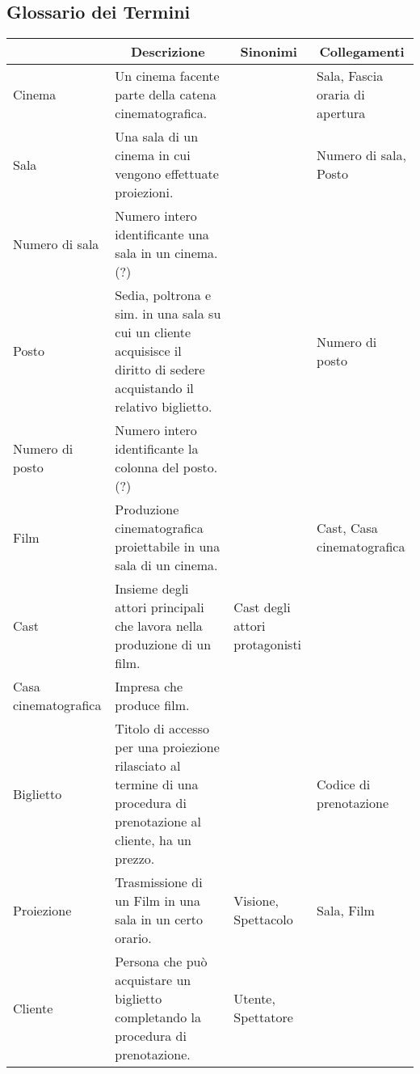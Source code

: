 \subsection*{Glossario dei Termini}
%
%
\begin{longtable}{|p{3.86cm}|p{3.86cm}|p{3.86cm}|p{3.86cm}|}
    \hline
    \rowcolor{tblhdrcolor}
    \multicolumn{1}{|c|}{\textbf{Termine}}
     & \multicolumn{1}{|c|}{\textbf{Descrizione}}
     & \multicolumn{1}{|c|}{\textbf{Sinonimi}}
     & \multicolumn{1}{|c|}{\textbf{Collegamenti}}
    \\\hline
    Cinema
     & Un cinema facente parte della catena cinematografica.
     &
     & Sala, Fascia oraria di apertura
    \\\hline
    Sala
     & Una sala di un cinema in cui vengono effettuate proiezioni.
     &
     & Numero di sala, Posto
    \\\hline
    Numero di sala
     & Numero intero identificante una sala in un cinema. (?)
     &
     &
    \\\hline
    Posto
     & Sedia, poltrona e sim. in una sala su cui un cliente acquisisce
    il diritto di sedere acquistando il relativo biglietto.
     &
     & Numero di posto
    \\\hline
    Numero di posto
     & Numero intero identificante la colonna del posto. (?)
     &
     &
    \\\hline
    Film
     & Produzione cinematografica proiettabile in una sala di un cinema.
     &
     & Cast, Casa cinematografica
    \\\hline
    Cast
     & Insieme degli attori principali che lavora nella produzione di un film.
     & Cast degli attori protagonisti
     &
    \\\hline
    Casa cinematografica
     & Impresa che produce film.
     &
     &
    \\ \hline
    Biglietto
     & Titolo di accesso per una proiezione rilasciato al termine di una
    procedura di prenotazione al cliente, ha un prezzo.
     &
     & Codice di prenotazione
    \\ \hline
    Proiezione
     & Trasmissione di un Film in una sala in un certo orario.
     & Visione, Spettacolo
     & Sala, Film
    \\ \hline
    Cliente
     & Persona che può acquistare un biglietto completando la procedura di
    prenotazione.
     & Utente, Spettatore

\end{longtable}
